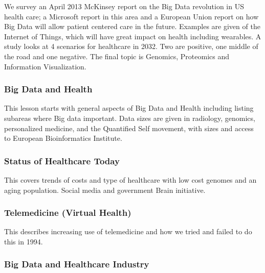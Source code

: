 We survey an April 2013 McKinsey report on the Big Data revolution in US
health care; a Microsoft report in this area and a European Union report
on how Big Data will allow patient centered care in the future. Examples
are given of the Internet of Things, which will have great impact on
health including wearables. A study looks at 4 scenarios for healthcare
in 2032. Two are positive, one middle of the road and one negative. The
final topic is Genomics, Proteomics and Information Visualization.

\subsubsection{Big Data and Health}\label{big-data-and-health}

This lesson starts with general aspects of Big Data and Health including
listing subareas where Big data important. Data sizes are given in
radiology, genomics, personalized medicine, and the Quantified Self
movement, with sizes and access to European Bioinformatics Institute.


\subsubsection{Status of Healthcare
Today}\label{status-of-healthcare-today}

This covers trends of costs and type of healthcare with low cost genomes
and an aging population. Social media and government Brain initiative.


\subsubsection{Telemedicine (Virtual
Health)}\label{telemedicine-virtual-health}

This describes increasing use of telemedicine and how we tried and
failed to do this in 1994.



\subsubsection{Big Data and Healthcare
Industry}\label{big-data-and-healthcare-industry}

